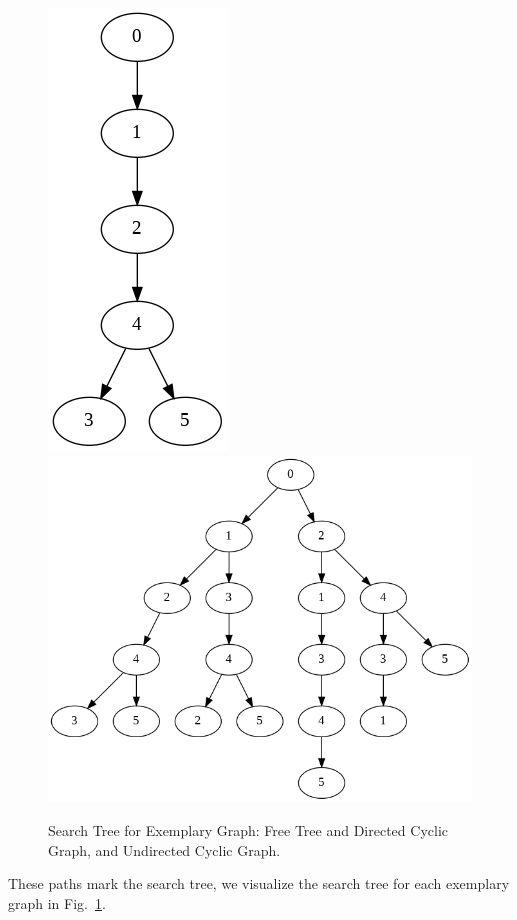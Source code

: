 \documentclass[main.tex]{subfiles}
\begin{document}
\begin{figure}[!ht]
    \centering
     \includegraphics[width=0.2\columnwidth]{fig/free_tree.png}
      \includegraphics[width=0.75\columnwidth]{fig/search_tree_dfs.png}
    \caption{Search Tree for Exemplary Graph: Free Tree and Directed Cyclic Graph, and Undirected Cyclic Graph.}
    \label{fig:graph_search_example_search_tree}
\end{figure}

These paths mark the search tree, we visualize the search tree for each exemplary graph in Fig.~\ref{fig:graph_search_example_search_tree}. 

\end{document}
